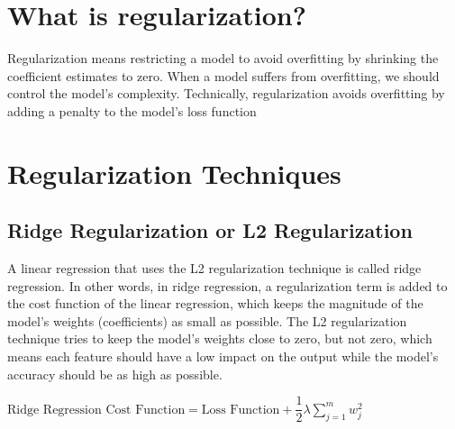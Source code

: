\section{What is regularization?}
    Regularization means restricting a model to avoid overfitting by shrinking the coefficient estimates to zero. When a model suffers from overfitting, we should control the model's complexity. Technically, regularization avoids overfitting by adding a penalty to the model's loss function
\section{Regularization Techniques}
    \subsection{Ridge Regularization or L2 Regularization}
        A linear regression that uses the L2 regularization technique is called ridge regression. In other words, in ridge regression, a regularization term is added to the cost function of the linear regression, which keeps the magnitude of the model’s weights (coefficients) as small as possible. The L2 regularization technique tries to keep the model’s weights close to zero, but not zero, which means each feature should have a low impact on the output while the model's accuracy should be as high as possible.
        
        $\text{Ridge Regression Cost Function} = \text{Loss Function} + \dfrac{1}{2} \lambda\sum_{j=1}^m w_j^2$

